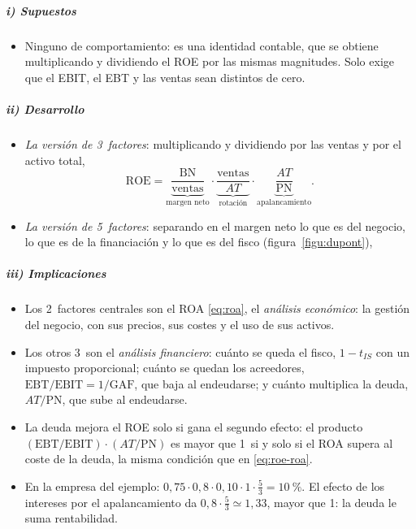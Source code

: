 \documentclass[11pt]{article}
\begin{document}
\subparagraph{i) Supuestos}

\begin{itemize}
\item Ninguno de comportamiento: es una identidad contable, que se obtiene multiplicando y dividiendo el ROE por las mismas magnitudes. Solo exige que el EBIT, el EBT y las ventas sean distintos de cero.
\end{itemize}

\subparagraph{ii) Desarrollo}

\begin{itemize}
\item \emph{La versión de 3~factores}: multiplicando y dividiendo por las ventas y por el activo total,
  \[
  \mathrm{ROE}=\underbrace{\frac{\mathrm{BN}}{\text{ventas}}}_{\text{margen neto}}\cdot\underbrace{\frac{\text{ventas}}{AT}}_{\text{rotación}}\cdot\underbrace{\frac{AT}{\mathrm{PN}}}_{\text{apalancamiento}}.
  \]
\item \emph{La versión de 5~factores}: separando en el margen neto lo que es del negocio, lo que es de la financiación y lo que es del fisco (figura~\ref{figu:dupont}),
\end{itemize}

\subparagraph{iii) Implicaciones}

\begin{itemize}
\item Los 2~factores centrales son el ROA \eqref{eq:roa}, el \emph{análisis económico}: la gestión del negocio, con sus precios, sus costes y el uso de sus activos.
\item Los otros 3~son el \emph{análisis financiero}: cuánto se queda el fisco, $1-t_{IS}$ con un impuesto proporcional; cuánto se quedan los acreedores, $\mathrm{EBT}/\mathrm{EBIT}=1/\mathrm{GAF}$, que baja al endeudarse; y cuánto multiplica la deuda, $AT/\mathrm{PN}$, que sube al endeudarse.
\item La deuda mejora el ROE solo si gana el segundo efecto: el producto $(\mathrm{EBT}/\mathrm{EBIT})\cdot(AT/\mathrm{PN})$ es mayor que 1~si y solo si el ROA supera al coste de la deuda, la misma condición que en \eqref{eq:roe-roa}.
\item En la empresa del ejemplo: $0{,}75\cdot0{,}8\cdot0{,}10\cdot1\cdot\tfrac{5}{3}=10~\%$. El efecto de los intereses por el apalancamiento da $0{,}8\cdot\tfrac53\simeq1{,}33$, mayor que 1: la deuda le suma rentabilidad.
\end{itemize}
\end{document}
